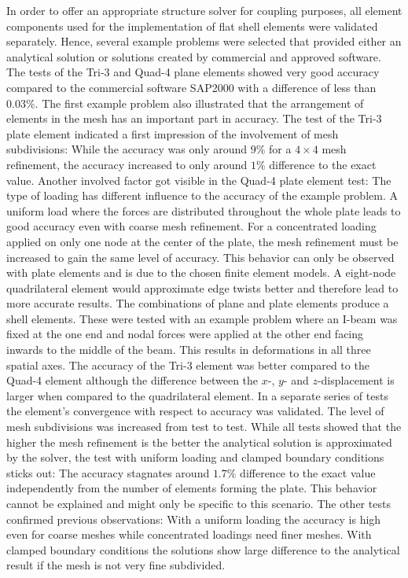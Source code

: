   In order to offer an appropriate structure solver for coupling purposes, all element components used for the implementation of flat shell elements were validated separately. Hence, several example problems were selected that provided either an analytical solution or solutions created by commercial and approved software. The tests of the Tri-3 and Quad-4 plane elements showed very good accuracy compared to the commercial software SAP2000 with a difference of less than $0.03\%$. The first example problem also illustrated that the arrangement of elements in the mesh has an important part in accuracy. The test of the Tri-3 plate element indicated a first impression of the involvement of mesh subdivisions: While the accuracy was only around $9\%$ for a $4\!\times\!4$ mesh refinement, the accuracy increased to only around $1\%$ difference to the exact value. Another involved factor got visible in the Quad-4 plate element test: The type of loading has different influence to the accuracy of the example problem. A uniform load where the forces are distributed throughout the whole plate leads to good accuracy even with coarse mesh refinement. For a concentrated loading applied on only one node at the center of the plate, the mesh refinement must be increased to gain the same level of accuracy. This behavior can only be observed with plate elements and is due to the chosen finite element models. A eight-node quadrilateral element would approximate edge twists better and therefore lead to more accurate results. The combinations of plane and plate elements produce a shell elements. These were tested with an example problem where an I-beam was fixed at the one end and nodal forces were applied at the other end facing inwards to the middle of the beam. This results in deformations in all three spatial axes. The accuracy of the Tri-3 element was better compared to the Quad-4 element although the difference between the $x$-, $y$- and $z$-displacement is larger when compared to the quadrilateral element.
  In a separate series of tests the element's convergence with respect to accuracy was validated. The level of mesh subdivisions was increased from test to test. While all tests showed that the higher the mesh refinement is the better the analytical solution is approximated by the solver, the test with uniform loading and clamped boundary conditions sticks out: The accuracy stagnates around $1.7\%$ difference to the exact value independently from the number of elements forming the plate. This behavior cannot be explained and might only be specific to this scenario. The other tests confirmed previous observations: With a uniform loading the accuracy is high even for coarse meshes while concentrated loadings need finer meshes. With clamped boundary conditions the solutions show large difference to the analytical result if the mesh is not very fine subdivided.
  
